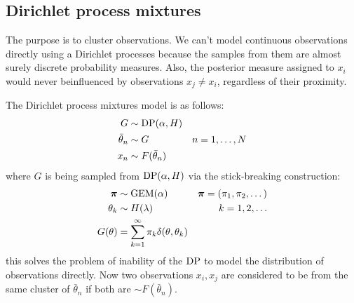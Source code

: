 \subsection{Dirichlet process mixtures}
The purpose is to cluster observations. We can't model continuous observations directly using a Dirichlet processes because the samples from them are almost surely discrete probability measures. Also, the posterior measure assigned to $x_i$ would never beinfluenced by observations $x_j \neq x_i$, regardless of their proximity.

The Dirichlet process mixtures model is as follows:
\begin{align*}
	G 				&\sim \operatorname{DP}(\alpha, H) \\
	\bar \theta_n	&\sim G 				& n = 1, \dotsc, N \\
	x_n				&\sim F(\bar \theta_n)
\end{align*}
where $G$ is being sampled from $\operatorname{DP}(\alpha, H)$ via the stick-breaking construction:
\begin{align*}
	\boldsymbol{\mathbf{\pi}} 	&\sim \operatorname{GEM}(\alpha)	& \boldsymbol{\mathbf{\pi}} = (\pi_1, \pi_2, \dotsc)\\
	\theta_k	&\sim H(\lambda)	& k = 1, 2, \dotsc \\
	G(\theta)	&= \sum_{k = 1}^\infty \pi_k \delta(\theta, \theta_k)
\end{align*}
this solves the problem of inability of the $\operatorname{DP}$ to model the distribution of observations directly. Now two observations $x_i, x_j$ are considered to be from the same cluster of $\bar \theta_n$ if both are $\sim F(\bar \theta_n)$.